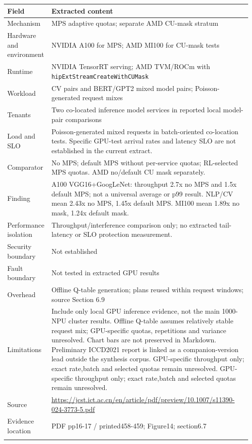 \cite{P001}

\begin{longtable}{>{\raggedright\arraybackslash}p{}>{\raggedright\arraybackslash}p{}}
\toprule
\textbf{Field} & \textbf{Extracted content}\\\midrule\endhead
Mechanism & MPS adaptive quotas; separate AMD CU-mask stratum\\\addlinespace
Hardware and environment & NVIDIA A100 for MPS; AMD MI100 for CU-mask tests\\\addlinespace
Runtime & NVIDIA TensorRT serving; AMD TVM/ROCm with \nolinkurl{hipExtStreamCreateWithCUMask}\\\addlinespace
Workload & CV pairs and BERT/GPT2 mixed model pairs; Poisson-generated request mixes\\\addlinespace
Tenants & Two co-located inference model services in reported local model-pair comparisons\\\addlinespace
Load and SLO & Poisson-generated mixed requests in batch-oriented co-location tests. Specific GPU-test arrival rates and latency SLO are not established in the current extract.\\\addlinespace
Comparator & No MPS; default MPS without per-service quotas; RL-selected MPS quotas. AMD no/default CU mask separately.\\\addlinespace
Finding & A100 VGG16+GoogLeNet: throughput 2.7x no MPS and 1.5x default MPS; not a universal average or p99 result. NLP/CV mean 2.43x no MPS, 1.45x default MPS. MI100 mean 1.89x no mask, 1.24x default mask.\\\addlinespace
Performance isolation & Throughput/interference comparison only; no extracted tail-latency or SLO protection measurement.\\\addlinespace
Security boundary & Not established\\\addlinespace
Fault boundary & Not tested in extracted GPU results\\\addlinespace
Overhead & Offline Q-table generation; plans reused within request windows; source Section 6.9\\\addlinespace
Limitations & Include only local GPU inference evidence, not the main 1000-NPU cluster results. Offline Q-table assumes relatively stable request mix; GPU-specific quotas, repetitions and variance unresolved. Chart bars are not preserved in Markdown. Preliminary ICCD2021 report is linked as a companion-version lead outside the synthesis corpus. GPU-specific throughput only; exact rate,batch and selected quotas remain unresolved. GPU-specific throughput only; exact rate,batch and selected quotas remain unresolved.\\\addlinespace
Source & \url{https://jcst.ict.ac.cn/en/article/pdf/preview/10.1007/s11390-024-3773-5.pdf}\\\addlinespace
Evidence location & PDF pp16-17 / printed458-459; Figure14; section6.7\\\addlinespace
\bottomrule\end{longtable}


